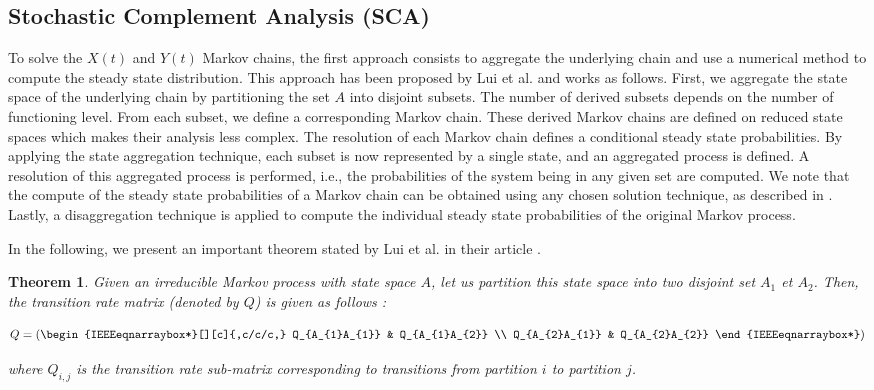 \documentclass[conference]{IEEEtran}
\newtheorem{thm}{Theorem}
\begin{document}
\subsection{Stochastic Complement Analysis (SCA)} %

\label{sec:SCA}
To solve the $X(t)$ and $Y(t)$ Markov chains, the first approach consists to aggregate the underlying chain and use a numerical method to compute the steady state distribution. This approach has been proposed by Lui et al.  \cite{lui1999stochastic}
and works as follows. First, we aggregate the state space of the underlying chain by partitioning the set $A$ into disjoint subsets. The number of derived subsets depends on the number of functioning level. From each subset, we define a corresponding Markov chain. These derived Markov chains are defined on reduced state spaces which makes their analysis less complex. The resolution of each Markov chain defines a conditional steady state probabilities.
By applying the state aggregation technique, each subset is now represented by a single state, and an aggregated process is defined. A resolution of this aggregated process is performed, i.e., the probabilities of the system being in any given set are computed. We note that the compute of the steady state probabilities of a Markov chain can be obtained using any chosen solution technique, as described in \cite{Stew95}.
Lastly, a disaggregation technique is applied to compute the individual steady state probabilities of the original Markov process.


In the following, we present an important theorem stated by  Lui et al.   in their article \cite{lui1999stochastic}.

\begin{thm}
\label{thm:thm1}
    Given an irreducible Markov process with state space $A$, let us partition this state space into two disjoint set $A_1$ et $A_2$. Then, the transition rate matrix (denoted by $Q$) is given as follows :

\begin{equation}
Q = \left(\begin{IEEEeqnarraybox*}[][c]{,c/c/c,}
    Q_{A_{1}A_{1}}       & Q_{A_{1}A_{2}} \\
    Q_{A_{2}A_{1}}       & Q_{A_{2}A_{2}} %
\end{IEEEeqnarraybox*}\right)
\end{equation}

where $Q_{i,j}$ is the transition rate sub-matrix corresponding to transitions from partition $i$ to partition $j$.

\end{thm}
\end{document}
